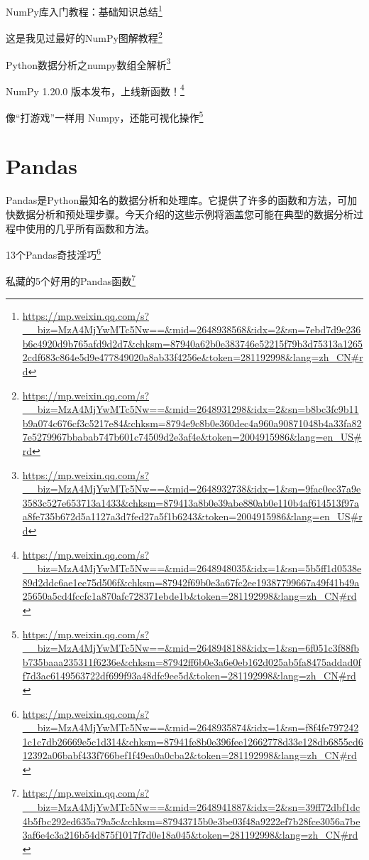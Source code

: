 \documentclass[]{ctexbook}
\renewcommand{\href}[2]{#2\footnote{\url{#1}}}
\begin{document}
\href{https://mp.weixin.qq.com/s?__biz=MzA4MjYwMTc5Nw==\&mid=2648938568\&idx=2\&sn=7ebd7d9e236b6c4920d9b765afd9d2d7\&chksm=87940a62b0e383746e52215f79b3d75313a12652cdf683c864e5d9e477849020a8ab33f4256e\&token=281192998\&lang=zh_CN\#rd}{NumPy库入门教程：基础知识总结}

\href{https://mp.weixin.qq.com/s?__biz=MzA4MjYwMTc5Nw==\&mid=2648931298\&idx=2\&sn=b8bc3fc9b11b9a074c676cf3c5217e84\&chksm=8794e9c8b0e360dec4a960a90871048b4a33fa827e5279967bbabab747b601c74509d2e3af4e\&token=2004915986\&lang=en_US\#rd}{这是我见过最好的NumPy图解教程}

\href{https://mp.weixin.qq.com/s?__biz=MzA4MjYwMTc5Nw==\&mid=2648932738\&idx=1\&sn=9fac0ec37a9e3583c527e653713a1433\&chksm=879413a8b0e39abe880ab0e110b4af614513f97aa8fe735b672d5a1127a3d7fed27a5f1b6243\&token=2004915986\&lang=en_US\#rd}{Python数据分析之numpy数组全解析}

\href{https://mp.weixin.qq.com/s?__biz=MzA4MjYwMTc5Nw==\&mid=2648948035\&idx=1\&sn=5b5ff1d0538e89d2ddc6ae1ec75d506f\&chksm=87942f69b0e3a67fc2ee19387799667a49f41b49a25650a5cd4fccfc1a870afc728371ebde1b\&token=281192998\&lang=zh_CN\#rd}{NumPy 1.20.0 版本发布，上线新函数！}

\href{https://mp.weixin.qq.com/s?__biz=MzA4MjYwMTc5Nw==\&mid=2648948188\&idx=1\&sn=6f051c3f88fbb735baaa235311f6236e\&chksm=87942ff6b0e3a6e0eb162d025ab5fa8475addad0ff7d3ac6149563722df699f93a48dfc9ee5d\&token=281192998\&lang=zh_CN\#rd}{像``打游戏''一样用 Numpy，还能可视化操作}

\hypertarget{pandas}{%
\section{Pandas}\label{pandas}}

Pandas是Python最知名的数据分析和处理库。它提供了许多的函数和方法，可加快数据分析和预处理步骤。今天介绍的这些示例将涵盖您可能在典型的数据分析过程中使用的几乎所有函数和方法。

\href{https://mp.weixin.qq.com/s?__biz=MzA4MjYwMTc5Nw==\&mid=2648935874\&idx=1\&sn=f8f4fe7972421c1c7db26669e5c1d314\&chksm=87941fe8b0e396fee12662778d33e128db6855cd612392a06babf433f766bef1f49ea0a0cba2\&token=281192998\&lang=zh_CN\#rd}{13个Pandas奇技淫巧}

\href{https://mp.weixin.qq.com/s?__biz=MzA4MjYwMTc5Nw==\&mid=2648941887\&idx=2\&sn=39ff72dbf1dc4b5fbc292ed635a79a5c\&chksm=87943715b0e3be03f48a9222ef7b28fce3056a7be3af6e4c3a216b54d875f1017f7d0e18a045\&token=281192998\&lang=zh_CN\#rd}{私藏的5个好用的Pandas函数}
\end{document}

